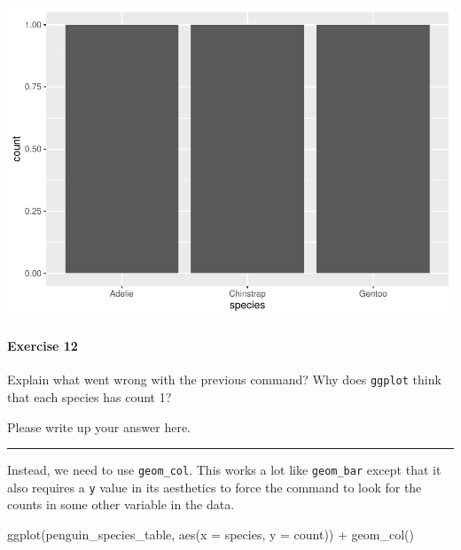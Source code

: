 \documentclass[
]{book}
\newenvironment{Shaded}{\begin{snugshade}}{\end{snugshade}}
\newcommand{\AttributeTok}[1]{\textcolor[rgb]{0.77,0.63,0.00}{#1}}
\newcommand{\FunctionTok}[1]{\textcolor[rgb]{0.00,0.00,0.00}{#1}}
\newcommand{\NormalTok}[1]{#1}
\newcommand{\SpecialCharTok}[1]{\textcolor[rgb]{0.00,0.00,0.00}{#1}}
\begin{document}
\includegraphics{intro_stats_files/figure-latex/unnamed-chunk-74-1.pdf}

\hypertarget{exercise-12}{%
\paragraph*{Exercise 12}\label{exercise-12}}

Explain what went wrong with the previous command? Why does \texttt{ggplot} think that each species has count 1?

Please write up your answer here.

\begin{center}\rule{0.5\linewidth}{0.5pt}\end{center}

Instead, we need to use \texttt{geom\_col}. This works a lot like \texttt{geom\_bar} except that it also requires a \texttt{y} value in its aesthetics to force the command to look for the counts in some other variable in the data.

\begin{Shaded}
\begin{Highlighting}[]
\FunctionTok{ggplot}\NormalTok{(penguin\_species\_table, }\FunctionTok{aes}\NormalTok{(}\AttributeTok{x =}\NormalTok{ species, }\AttributeTok{y =}\NormalTok{ count)) }\SpecialCharTok{+}
    \FunctionTok{geom\_col}\NormalTok{()}
\end{Highlighting}
\end{Shaded}
\end{document}
